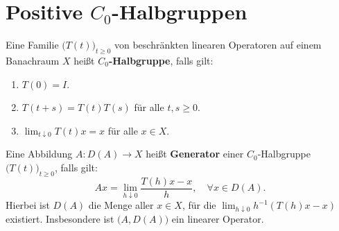 


 
\section{Positive $C_0$-Halbgruppen}

\begin{defi}
Eine Familie $\big(T(t)\big)_{t\geq0}$ von beschränkten linearen Operatoren auf einem Banachraum $X$  heißt \textbf{$C_0$-Halbgruppe}, falls gilt:
\begin{enumerate}
\item $T(0)=I$.
\item $T(t+s)=T(t)T(s)$ für alle $t,s\geq0$.
\item $\lim_{t\downarrow 0}T(t)x=x$ für alle $x\in X$.
\end{enumerate}
\end{defi}
\begin{defi}
Eine Abbildung $A\colon D(A)\to X$ heißt \textbf{Generator} einer $C_0$-Halbgruppe $\big(T(t)\big)_{t\geq0}$, falls gilt:
\begin{equation*}
Ax=\lim_{h\downarrow 0}\frac{T(h)x - x}{h},\quad \forall x\in D(A).
\end{equation*}
Hierbei ist $D(A)$ die Menge aller $x\in X$, für die $\lim_{h\downarrow 0} h^{-1}(T(h)x-x)$ existiert. Insbesondere ist $\big(A, D(A)\big)$  ein linearer Operator. 
\par
\end{defi}

